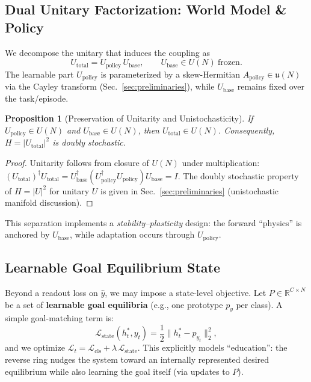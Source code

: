 \documentclass[11pt,a4paper]{article}
\newtheorem{proposition}[theorem]{Proposition}
\newcommand{\LL}{\mathcal{L}}
\begin{document}
\subsection{Dual Unitary Factorization: World Model \& Policy}

We decompose the unitary that induces the coupling as
\begin{equation}
U_{\text{total}} = U_{\text{policy}}\,U_{\text{base}}, \qquad U_{\text{base}}\in U(N)\ \text{frozen.}
\end{equation}
The learnable part $U_{\text{policy}}$ is parameterized by a skew-Hermitian $A_{\text{policy}}\in\mathfrak{u}(N)$ via the Cayley transform (Sec.~\ref{sec:preliminaries}), while $U_{\text{base}}$ remains fixed over the task/episode.

\begin{proposition}[Preservation of Unitarity and Unistochasticity]
\label{prop:dual_unitary}
If $U_{\text{policy}}\in U(N)$ and $U_{\text{base}}\in U(N)$, then $U_{\text{total}}\in U(N)$. Consequently, $H=|U_{\text{total}}|^2$ is doubly stochastic.
\end{proposition}

\begin{proof}
Unitarity follows from closure of $U(N)$ under multiplication:
$(U_{\text{total}})^\dagger U_{\text{total}} = U_{\text{base}}^\dagger(U_{\text{policy}}^\dagger U_{\text{policy}})U_{\text{base}} = I$.
The doubly stochastic property of $H=|U|^2$ for unitary $U$ is given in Sec.~\ref{sec:preliminaries} (unistochastic manifold discussion).
\end{proof}

This separation implements a \emph{stability--plasticity} design: the forward ``physics'' is anchored by $U_{\text{base}}$, while adaptation occurs through $U_{\text{policy}}$.

\subsection{Learnable Goal Equilibrium State}

Beyond a readout loss on $\hat{y}$, we may impose a state-level objective. Let $P\in\mathbb{R}^{C\times N}$ be a set of \textbf{learnable goal equilibria} (e.g., one prototype $p_y$ per class). A simple goal-matching term is:
\begin{equation}
\LL_{\text{state}}(h_t^*, y_t) = \frac{1}{2}\|h_t^* - p_{y_t}\|_2^2,
\end{equation}
and we optimize $\LL_t = \LL_{\text{cls}} + \lambda\,\LL_{\text{state}}$.
This explicitly models ``education'': the reverse ring nudges the system toward an internally represented desired equilibrium while also learning the goal itself (via updates to $P$).
\end{document}
